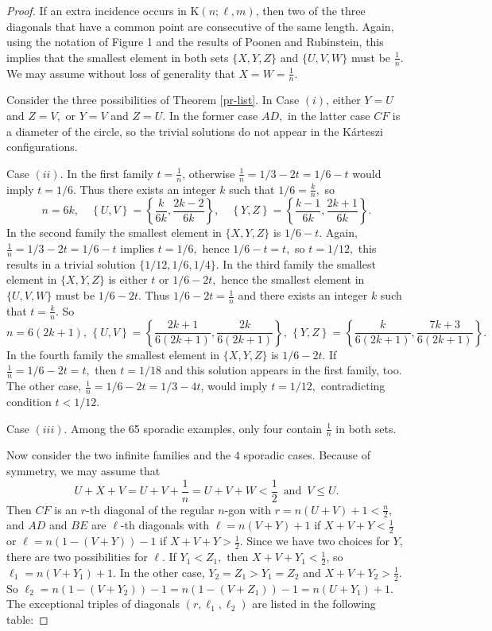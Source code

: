 \documentclass[12pt]{article}
\theoremstyle{definition} \newtheorem*{definition}              {Definition}
\theoremstyle{definition} \newtheorem {remark}                   {Remark}
\theoremstyle{definition} \newtheorem*{problem}                {Problem}
\theoremstyle{definition} \newtheorem{example}     [thm]{Example}
\begin{document}
\begin{proof}
If an extra incidence occurs in $\mathrm{K}(n;\ell,m)$, then two of the three diagonals that have a common point 
are consecutive of the same length. Again, using the notation of Figure 1 and the results of Poonen and Rubinstein, 
this implies that the smallest element in both sets 
$\{ X,Y,Z\} $ and $\{ U,V,W\} $ must be $\frac{1}{n}$. 
We may assume without loss of generality that 
$X=W=\frac{1}{n}$. 

Consider the three possibilities of Theorem \ref{pr-list}.
In Case $(i)$, either $Y=U$ and $Z=V,$ or $Y=V$ and $Z=U.$ In the former case $AD,$ in the latter case $CF$ 
is a diameter of the circle, so the trivial solutions do not appear in the Kárteszi configurations.
\medskip

Case $(ii)$. In the first family $t=\frac{1}{n}$, otherwise $\frac{1}{n}=1/3-2t=1/6-t$
would imply $t=1/6.$ Thus there exists an integer $k$ such that $1/6= \frac{k}{n},$ so
$$n=6k, \quad \left\{ U,V\right\} =\left\{ \frac{k}{6k}, \frac{2k-2}{6k}\right\} , 
\quad \left\{ Y,Z\right\} =\left\{ \frac{k-1}{6k}, \frac{2k+1}{6k}\right\} .$$
In the second family the smallest element in $\{ X,Y,Z\} $ is $1/6-t.$ Again,
$\frac{1}{n}=1/3-2t=1/6-t$ implies $t=1/6,$ hence $1/6-t=t,$ so $t=1/12,$ this
results in a trivial solution $\{1/12, 1/6, 1/4\} .$ In the third family the smallest element in 
$\{ X,Y,Z\} $ is either $t$ or $1/6-2t,$ hence the smallest element in $\{ U,V,W\} $  
must be $1/6-2t.$ Thus $1/6-2t=\frac{1}{n}$ and there exists an integer $k$ such that 
$t= \frac{k}{n}.$ So 
$$
n=6(2k+1), \, \left\{ U,V\right\} =
\left\{ \frac{2k+1}{6(2k+1)}, \frac{2k}{6(2k+1)}\right\} , \, \left\{Y,Z\right\} =
\left\{ \frac{k}{6(2k+1)}, \frac{7k+3}{6(2k+1)}\right\}.
$$
In the fourth family the smallest element in $\{ X,Y,Z\} $ is $1/6-2t.$ 
If $\frac{1}{n}=1/6-2t=t,$ then $t=1/18$ and this solution appears in the first family, too. The other case, 
$\frac{1}{n}=1/6-2t=1/3-4t$, 
would imply $t=1/12,$ contradicting condition $t<1/12.$ 
\medskip

Case $(iii)$. Among the 65 sporadic examples, only four contain $\frac{1}{n}$ in both sets.

Now consider the two infinite families and the
$4$ sporadic cases. Because of symmetry, we may assume that 
$$U+X+V=U+V+\frac{1}{n}=U+V+W<\frac{1}{2} \, \text{  and  } \, V\leq U.$$
Then $CF$ is an $r$-th diagonal of the regular $n$-gon with 
$r=n(U+V)+1<\frac{n}{2}$, and  
$AD$ and $BE$ are $\ell$-th diagonals with $\ell =n(V+Y)+1$ if 
$X+V+Y<\frac{1}{2}$ or $\ell =n(1-(V+Y))-1$ if $X+V+Y>\frac{1}{2}$.
Since we have two choices for $Y$, there are two possibilities for $\ell .$ 
If $Y_1<Z_1,$ then $X+V+Y_1<\frac{1}{2}$, so $\ell _1=n(V+Y_1)+1.$
In the other case, $Y_2=Z_1>Y_1=Z_2$ and $X+V+Y_2>\frac{1}{2}$. So
$\ell _2=n(1-(V+Y_2))-1=n(1-(V+Z_1))-1=n(U+Y_1)+1.$
The exceptional triples of diagonals $(r,\ell _1,\ell _2)$ are listed in the following table:


\end{proof}
\end{document}
